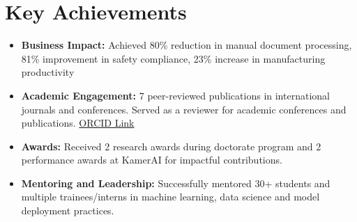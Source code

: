 \documentclass[a4paper,11pt]{article}
\begin{document}
\section{Key Achievements}
  \begin{itemize}[leftmargin=*, itemsep = -4pt]
    \item{\textbf{Business Impact: }Achieved 80\% reduction in manual document processing, 81\% improvement in safety compliance, 23\% increase in manufacturing productivity}
    \item {\textbf{Academic Engagement: }7 peer-reviewed publications in international journals and conferences. Served as a reviewer for academic conferences and publications. \href{https://orcid.org/0000-0002-2247-9046}{ORCID Link}}
    \item {\textbf{Awards: }Received 2 research awards during doctorate program and 2 performance awards at KamerAI for impactful contributions.}
    \item {\textbf{Mentoring and Leadership: }Successfully mentored 30+ students and multiple trainees/interns in machine learning, data science and model deployment practices.}
  \end{itemize}
\end{document}
